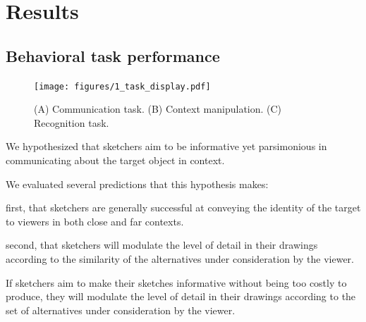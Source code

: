 \documentclass[9pt,twocolumn,twoside]{pnas-new}
\begin{document}
\section*{Results}

\subsection*{Behavioral task performance}



\begin{figure}[htbp]
\centering
\texttt{[image: figures/1\_task\_display.pdf]}
\caption{(A) Communication task. (B) Context manipulation. (C) Recognition task.}
\label{task_display}
\end{figure}


We hypothesized that sketchers aim to be informative yet parsimonious in communicating about the target object in context.

We evaluated several predictions that this hypothesis makes:

first, that sketchers are generally successful at conveying the identity of the target to viewers in both close and far contexts.

second, that sketchers will modulate the level of detail in their drawings according to the similarity of the alternatives under consideration by the viewer.

If sketchers aim to make their sketches informative without being too costly to produce, they will modulate the level of detail in their drawings according to the set of alternatives under consideration by the viewer.
\end{document}
